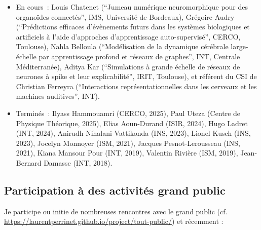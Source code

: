 \documentclass[10pt,french,a4paper,oneside]{article}%
\begin{document}
\begin{itemize}
	\item En cours~: Louis Chatenet (``Jumeau numérique neuromorphique pour des organoïdes connectés'', IMS, Université de Bordeaux), Grégoire Audry (``Prédictions efficaces d'évènements futurs dans les systèmes biologiques et artificiels à l'aide d'approches d'apprentissage auto-supervisé'', CERCO, Toulouse), Nahla Belloula (``Modélisation de la dynamique cérébrale large-échelle par apprentissage profond et réseaux de graphes'', INT, Centrale Méditerranée), Aditya Kar (``Simulations à grande échelle de réseaux de neurones à spike et leur explicabilité'', IRIT, Toulouse), et référent du CSI de Christian Ferreyra (``Interactions représentationnelles dans les cerveaux et les machines auditives'', INT).
	\item Terminés~: Ilyass Hammouamri (CERCO, 2025), Paul Uteza (Centre de Physique Théorique, 2025), Elias Aoun-Durand (ISIR, 2024), Hugo Ladret (INT, 2024), Anirudh Nihalani Vattikonda (INS, 2023), Lionel Kusch (INS, 2023), Jocelyn Monnoyer (ISM, 2021), Jacques Pesnot-Lerousseau (INS, 2021), Kiana Mansour Pour (INT, 2019), Valentin Rivière (ISM, 2019), Jean-Bernard Damasse (INT, 2018).
\end{itemize}

\subsection{Participation à des activités grand public} %

Je participe ou initie de nombreuses rencontres avec le grand public (cf. \url{https://laurentperrinet.github.io/project/tout-public/}) et récemment :
\end{document}
